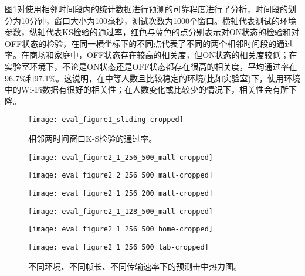 图\ref{fig:kstest}对使用相邻时间段内的统计数据进行预测的可靠程度进行了分析，时间段的划分为10分钟，窗口大小为100毫秒，测试次数为1000个窗口。横轴代表测试的环境参数，纵轴代表KS检验的通过率，红色与蓝色的点分别表示对ON状态的检验和对OFF状态的检验，在同一横坐标下的不同点代表了不同的两个相邻时间段的通过率。在商场和家庭中，OFF状态存在较高的相关度，但ON状态的相关度较低；在实验室环境下，不论是ON状态还是OFF状态都存在很高的相关度，平均通过率在96.7\%和97.1\%。这说明，在中等人数且比较稳定的环境(比如实验室)下，使用环境中的Wi-Fi数据有很好的相关性；在人数变化或比较少的情况下，相关性会有所下降。
\begin{figure}[t]
	\centering
	\texttt{[image: eval\_figure1\_sliding-cropped]}
	\caption{相邻两时间窗口K-S检验的通过率。}
	\label{fig:kstest}
\end{figure}
\begin{figure}[t]
	\begin{minipage}[b]{.32\linewidth}
		\texttt{[image: eval\_figure2\_1\_256\_500\_mall-cropped]}
		\label{fig:hitmap_256_500_0.6_mall}
	\end{minipage}
	\hfill
	\begin{minipage}[b]{.32\linewidth}
		\texttt{[image: eval\_figure2\_2\_256\_500\_mall-cropped]}
		\label{fig:hitmap_256_500_0.5_mall}
	\end{minipage}
	\hfill
	\begin{minipage}[b]{.32\linewidth}
		\texttt{[image: eval\_figure2\_1\_256\_200\_mall-cropped]}
		\label{fig:hitmap_256_200_0.6_mall}
	\end{minipage}
	
	\begin{minipage}[b]{.32\linewidth}
		\texttt{[image: eval\_figure2\_1\_128\_500\_mall-cropped]}
		\label{fig:hitmap_128_500_0.6_mall}
	\end{minipage}
	\hfill
	\begin{minipage}[b]{.32\linewidth}
		\texttt{[image: eval\_figure2\_1\_256\_500\_home-cropped]}
		\label{fig:hitmap_256_500_0.6_home}
	\end{minipage}
	\hfill
	\begin{minipage}[b]{.32\linewidth}
		\texttt{[image: eval\_figure2\_1\_256\_500\_lab-cropped]}
		\label{fig:hitmap_256_500_0.6_lab}
	\end{minipage}
	\caption{不同环境、不同帧长、不同传输速率下的预测击中热力图。}\label{fig:hitmap}
\end{figure}

